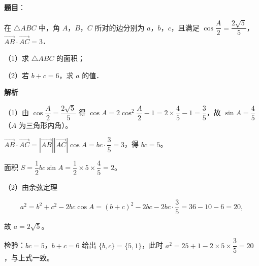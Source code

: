 \begin{answer}

\textbf{题目}：

在 $\triangle ABC$ 中，角 $A$，$B$，$C$ 所对的边分别为 $a$，$b$，$c$，且满足 $\cos\dfrac A2=\dfrac{2\sqrt5}{5}$，$\overrightarrow{AB}\cdot\overrightarrow{AC}=3$．

（1）求 $\triangle ABC$ 的面积；

（2）若 $b+c=6$，求 $a$ 的值．

\textbf{解析}

（1）由 $\cos\dfrac A2=\dfrac{2\sqrt5}{5}$ 得 $\cos A=2\cos^2\dfrac A2-1=2\times\dfrac45-1=\dfrac35$，故 $\sin A=\dfrac45$（$A$ 为三角形内角）。

$\overrightarrow{AB}\cdot\overrightarrow{AC}=|\overrightarrow{AB}||\overrightarrow{AC}|\cos A=bc\cdot\dfrac35=3$，得 $bc=5$。

面积 $S=\dfrac12bc\sin A=\dfrac12\times5\times\dfrac45=2$。

（2）由余弦定理

\nopagebreak[4]
\[a^2=b^2+c^2-2bc\cos A=(b+c)^2-2bc-2bc\cdot\frac35=36-10-6=20,\]

故 $a=2\sqrt5$。

检验：$bc=5$，$b+c=6$ 给出 $\{b,c\}=\{5,1\}$，此时 $a^2=25+1-2\times5\times\dfrac35=20$，与上式一致。


\end{answer}
